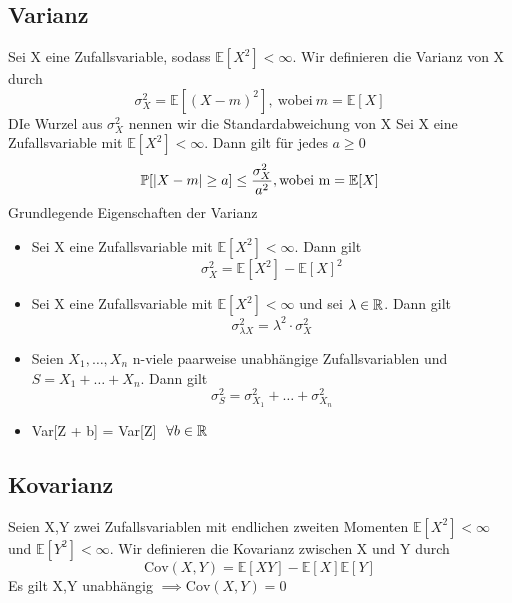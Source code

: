 \subsection{Varianz}
\Def[4.22] Sei X eine Zufallsvariable, sodass \( \mathbb{E}[X^2] < \infty \). Wir definieren die Varianz von X durch \[ \sigma_X^2 = \mathbb{E}[(X-m)^2], \ \text{wobei} \ m=\mathbb{E}[X]\] DIe Wurzel aus \(\sigma_X^2\) nennen wir die Standardabweichung von X \newline
{} \newline
Sei X eine Zufallsvariable mit \( \mathbb{E}[X^2] < \infty\). Dann gilt für jedes \( a \geq 0\) \[ \mathbb{P}[\left\lvert X -m \right\rvert \geq a] \leq \frac{\sigma_X^2}{a^2}, \text{wobei m} = \mathbb{E}[X]\]
\Satz[4.25] Grundlegende Eigenschaften der Varianz \newline
\begin{itemize}
    \item Sei X eine Zufallsvariable mit \( \mathbb{E}[X^2] < \infty \). Dann gilt \[ \sigma_X^2 = \mathbb{E}[X^2] - \mathbb{E}[X]^2\]
    \item Sei X eine Zufallsvariable mit \( \mathbb{E}[X^2] < \infty \) und sei \( \lambda \in \mathbb{R} \). Dann gilt \[ \sigma_{\lambda X}^2 = \lambda^2 \cdot \sigma_X^2\]
    \item Seien \(X_1, \dots , X_n \) n-viele paarweise unabhängige Zufallsvariablen und \(S = X_1 + \dots + X_n\). Dann gilt \[ \sigma_S^2 = \sigma_{X_1}^2 + \dots + \sigma_{X_n}^2\]
    \item Var[Z + b] = Var[Z] \(\  \forall b \in \mathbb{R} \)
\end{itemize}
\subsection{Kovarianz}
\Def[4.26] \newline
Seien X,Y zwei Zufallsvariablen mit endlichen zweiten Momenten \( \mathbb{E}[X^2] < \infty \) und \( \mathbb{E}[Y^2] < \infty \). Wir definieren die Kovarianz zwischen X und Y durch \[\text{Cov}(X,Y) = \mathbb{E}[XY]-\mathbb{E}[X]\mathbb{E}[Y]\]
\Bem[4.26A] \newline
Es gilt X,Y unabhängig \( \implies \text{Cov}(X,Y) = 0\)
